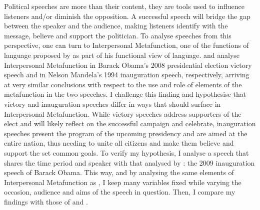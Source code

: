 \documentclass[11pt]{article}
\begin{document}
{	%
	Political speeches are more than their content, they are tools used to influence listeners and/or diminish the opposition.
	A successful speech will bridge the gap between the speaker and the audience, making listeners identify with the message, believe and support the politician.
	To analyse speeches from this perspective, one can turn to Interpersonal Metafunction, one of the functions of language proposed by \citet{Halliday1970IM} as part of his functional view of language.
	\citet{Ye} and \citet{Nur} analyse Interpersonal Metafunction in Barack Obama's 2008 presidential election victory speech and in Nelson Mandela's 1994 inauguration speech, respectively, 
	arriving at very similar conclusions with respect to the use and role of elements of the metafunction in the two speeches.
	I challenge this finding and hypothesise that victory and inauguration speeches differ in ways that should surface in Interpersonal Metafunction.
	While victory speeches address supporters of the elect and will likely reflect on the successful campaign and celebrate, inauguration speeches present the program of the upcoming presidency and are aimed at the entire nation, thus needing to unite all citizens and make them believe and support the set common goals.
	To verify my hypothesis, I analyse a speech that shares the time period and speaker with that analysed by \citeauthor{Ye}: the 2009 inauguration speech of Barack Obama. 
	This way, and by analysing the same elements of Interpersonal Metafunction as \citeauthor{Ye}, I keep many variables fixed while varying the occasion, audience and aims of the speech in question. Then, I compare my findings with those of \citeauthor{Ye} and \citeauthor{Nur}.
}


\end{document}
